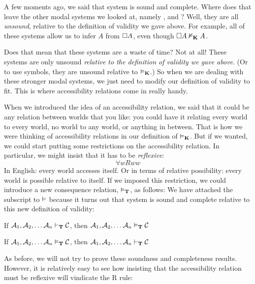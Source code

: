 A few moments ago, we said that system \mlK{} is sound and complete. Where does that leave the other modal systems we looked at, namely  \mlT, \mlSfour{} and \mlSfive? Well, they are all \emph{unsound}, relative to the definition of validity we gave above. For example, all of these systems allow us to infer $A$ from $\Box A$, even though $\Box A\nvDash_{\mathbf{K}} A$.

Does that mean that these systems are a waste of time? Not at all! These systems are only unsound \emph{relative to the definition of validity we gave above}. (Or to use symbols, they are unsound relative to $\vDash_{\mathbf{K}}$.) So when we are dealing with these stronger modal systems, we just need to modify our definition of validity to fit. This is where accessibility relations come in really handy.

When we introduced the idea of an accessibility relation, we said that it could be any relation between worlds that you like: you could have it relating every world to every world, no world to any world, or anything in between. That is how we were thinking of accessibility relations in our definition of $\vDash_{\mathbf{K}}$. But if we wanted, we could start putting some restrictions on the accessibility relation. In particular, we might insist that it has to be \emph{reflexive}:
\[\forall wRww\]
In English: every world accesses itself. Or in terms of relative possibility: every world is possible relative to itself. If we imposed this restriction, we could introduce a new consequence relation, $\vDash_{\mathbf{T}}$, as follows:
We have attached the \mlT{} subscript to $\vDash$ because it turns out that system \mlT{} is sound and complete relative to this new definition of validity:
\begin{compactlist}
	\item If $\mathcal{A}_1,\mathcal{A}_2, \dots \mathcal{A}_n\vdash_{\mathbf{T}}\mathcal{C}$, then $\mathcal{A}_1,\mathcal{A}_2, \dots \mathcal{A}_n\vDash_{\mathbf{T}}\mathcal{C}$
	\item If $\mathcal{A}_1,\mathcal{A}_2, \dots \mathcal{A}_n\vDash_{\mathbf{T}}\mathcal{C}$, then $\mathcal{A}_1,\mathcal{A}_2, \dots \mathcal{A}_n\vdash_{\mathbf{T}}\mathcal{C}$
\end{compactlist}
As before, we will not try to prove these soundness and completeness results. However, it is relatively easy to see how insisting that the accessibility relation must be reflexive will vindicate the R\mlT{} rule:
